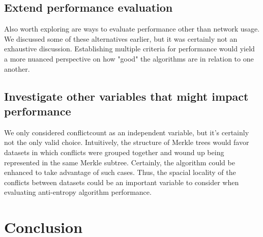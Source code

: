 \documentclass[11pt,letterpaper]{article}
\begin{document}
\subsection{Extend performance evaluation}
Also worth exploring are ways to evaluate performance other than network usage. We discussed some of these alternatives earlier, but it was certainly not an exhaustive discussion. Establishing multiple criteria for performance would yield a more nuanced perspective on how "good" the algorithms are in relation to one another.

\subsection{Investigate other variables that might impact performance}
We only considered conflictcount as an independent variable, but it's certainly not the only valid choice. Intuitively, the structure of Merkle trees would favor datasets in which conflicts were grouped together and wound up being represented in the same Merkle subtree. Certainly, the algorithm could be enhanced to take advantage of such cases. Thus, the spacial locality of the conflicts between datasets could be an important variable to consider when evaluating anti-entropy algorithm performance.

\section{Conclusion}
\end{document}
